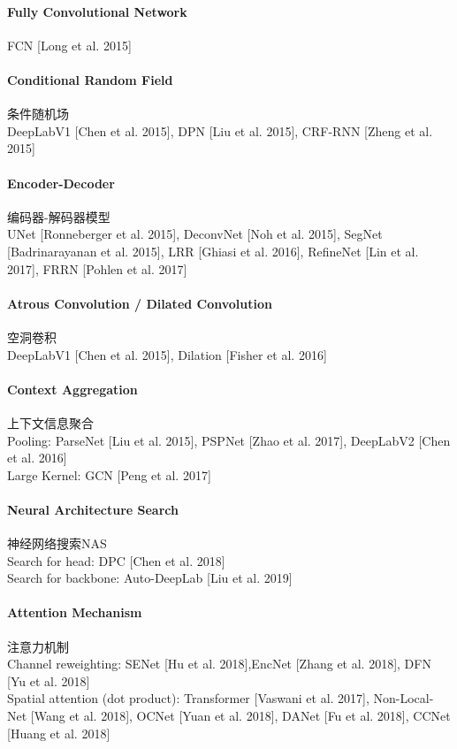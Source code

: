 \documentclass[UTF8, a4paper]{ctexart}
\begin{document}
\paragraph{Fully Convolutional Network}
FCN [Long et al. 2015]

\paragraph{Conditional Random Field}
条件随机场\\
DeepLabV1 [Chen et al. 2015], DPN [Liu et al. 2015], CRF-RNN [Zheng et al. 2015]

\paragraph{Encoder-Decoder}
编码器-解码器模型\\
UNet [Ronneberger et al. 2015], DeconvNet [Noh et al. 2015],
SegNet [Badrinarayanan et al. 2015], LRR [Ghiasi et al. 2016],
RefineNet [Lin et al. 2017], FRRN [Pohlen et al. 2017]

\paragraph{Atrous Convolution / Dilated Convolution}
空洞卷积\\
DeepLabV1 [Chen et al. 2015], Dilation [Fisher et al. 2016]

\paragraph{Context Aggregation}
上下文信息聚合\\
Pooling: ParseNet [Liu et al. 2015], PSPNet [Zhao et al. 2017], DeepLabV2 [Chen et al. 2016]\\
Large Kernel: GCN [Peng et al. 2017]

\paragraph{Neural Architecture Search}
神经网络搜索NAS\\
Search for head: DPC [Chen et al. 2018] \\
Search for backbone: Auto-DeepLab [Liu et al. 2019]

\paragraph{Attention Mechanism}
注意力机制\\
Channel reweighting: SENet [Hu et al. 2018],EncNet [Zhang et al. 2018], DFN [Yu et al. 2018]\\
Spatial attention (dot product): Transformer [Vaswani et al. 2017], Non-Local-Net [Wang et al. 2018], OCNet [Yuan et al. 2018], DANet [Fu et al. 2018], CCNet [Huang et al. 2018]
\end{document}
